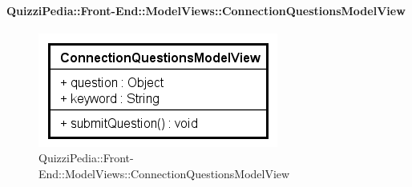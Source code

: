 \paragraph[QuizziPedia::Front-End::ModelViews\\::ConnectionQuestionsModelView]{QuizziPedia::Front-End::ModelViews::ConnectionQuestionsModelView}
\begin{figure} [ht]
	\centering
	\includegraphics[scale=0.80]{UML/Classi/Front-End/QuizziPedia_Front-end_ModelView_ConnectionQuestionsModelView.png}
	\caption{QuizziPedia::Front-End::ModelViews::ConnectionQuestionsModelView}
\end{figure} \FloatBarrier
